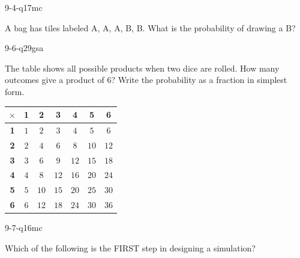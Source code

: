 \begin{practiceQuestion}{9-4-q17}{mc}
\begin{questionText}
A bag has tiles labeled A, A, A, B, B. What is the probability of drawing a B?
\end{questionText}
\end{practiceQuestion}

\begin{practiceQuestion}{9-6-q29}{gsa}
\begin{questionText}
The table shows all possible products when two dice are rolled. How many outcomes give a product of $6$? Write the probability as a fraction in simplest form.

\begin{center}
\begin{tabular}{|c|c|c|c|c|c|c|}
\hline
$\times$ & \textbf{1} & \textbf{2} & \textbf{3} & \textbf{4} & \textbf{5} & \textbf{6} \\
\hline
\textbf{1} & $1$ & $2$ & $3$ & $4$ & $5$ & $6$ \\
\hline
\textbf{2} & $2$ & $4$ & $6$ & $8$ & $10$ & $12$ \\
\hline
\textbf{3} & $3$ & $6$ & $9$ & $12$ & $15$ & $18$ \\
\hline
\textbf{4} & $4$ & $8$ & $12$ & $16$ & $20$ & $24$ \\
\hline
\textbf{5} & $5$ & $10$ & $15$ & $20$ & $25$ & $30$ \\
\hline
\textbf{6} & $6$ & $12$ & $18$ & $24$ & $30$ & $36$ \\
\hline
\end{tabular}
\end{center}
\end{questionText}
\end{practiceQuestion}

\begin{practiceQuestion}{9-7-q16}{mc}
\begin{questionText}
Which of the following is the FIRST step in designing a simulation?
\end{questionText}
\end{practiceQuestion}

